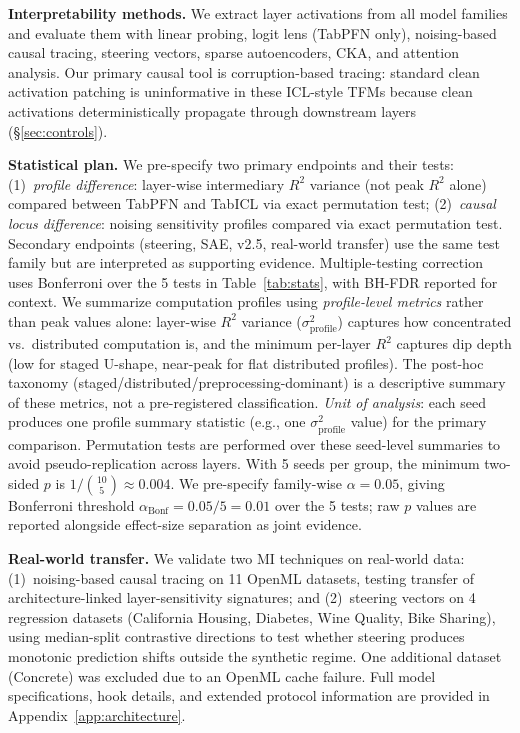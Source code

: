 \documentclass{article}
\begin{document}
\textbf{Interpretability methods.} We extract layer activations from all model families and evaluate them with linear probing, logit lens (TabPFN only), noising-based causal tracing, steering vectors, sparse autoencoders, CKA, and attention analysis. Our primary causal tool is corruption-based tracing: standard clean activation patching is uninformative in these ICL-style TFMs because clean activations deterministically propagate through downstream layers (\S\ref{sec:controls}).

\textbf{Statistical plan.} We pre-specify two primary endpoints and their tests: (1)~\textit{profile difference}: layer-wise intermediary $R^2$ variance (not peak $R^2$ alone) compared between TabPFN and TabICL via exact permutation test; (2)~\textit{causal locus difference}: noising sensitivity profiles compared via exact permutation test. Secondary endpoints (steering, SAE, v2.5, real-world transfer) use the same test family but are interpreted as supporting evidence. Multiple-testing correction uses Bonferroni over the 5 tests in Table~\ref{tab:stats}, with BH-FDR reported for context. We summarize computation profiles using \textit{profile-level metrics} rather than peak values alone: layer-wise $R^2$ variance ($\sigma^2_\text{profile}$) captures how concentrated vs.\ distributed computation is, and the minimum per-layer $R^2$ captures dip depth (low for staged U-shape, near-peak for flat distributed profiles). The post-hoc taxonomy (staged/distributed/preprocessing-dominant) is a descriptive summary of these metrics, not a pre-registered classification. \textit{Unit of analysis}: each seed produces one profile summary statistic (e.g., one $\sigma^2_\text{profile}$ value) for the primary comparison. Permutation tests are performed over these seed-level summaries to avoid pseudo-replication across layers. With 5 seeds per group, the minimum two-sided $p$ is $1/\binom{10}{5} \approx 0.004$. We pre-specify family-wise $\alpha = 0.05$, giving Bonferroni threshold $\alpha_{\text{Bonf}} = 0.05/5 = 0.01$ over the 5 tests; raw $p$ values are reported alongside effect-size separation as joint evidence.

\textbf{Real-world transfer.} We validate two MI techniques on real-world data: (1)~noising-based causal tracing on 11 OpenML datasets, testing transfer of architecture-linked layer-sensitivity signatures; and (2)~steering vectors on 4 regression datasets (California Housing, Diabetes, Wine Quality, Bike Sharing), using median-split contrastive directions to test whether steering produces monotonic prediction shifts outside the synthetic regime. One additional dataset (Concrete) was excluded due to an OpenML cache failure. Full model specifications, hook details, and extended protocol information are provided in Appendix~\ref{app:architecture}.
\end{document}

